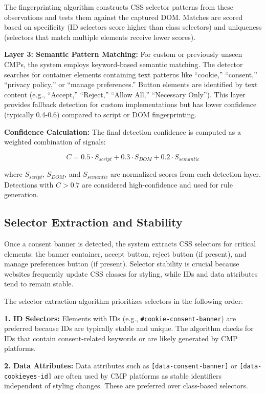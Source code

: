 \documentclass[conference]{IEEEtran}
\begin{document}
The fingerprinting algorithm constructs CSS selector patterns from these observations and tests them against the captured DOM. Matches are scored based on specificity (ID selectors score higher than class selectors) and uniqueness (selectors that match multiple elements receive lower scores).

\textbf{Layer 3: Semantic Pattern Matching:} For custom or previously unseen CMPs, the system employs keyword-based semantic matching. The detector searches for container elements containing text patterns like ``cookie,'' ``consent,'' ``privacy policy,'' or ``manage preferences.'' Button elements are identified by text content (e.g., ``Accept,'' ``Reject,'' ``Allow All,'' ``Necessary Only''). This layer provides fallback detection for custom implementations but has lower confidence (typically 0.4-0.6) compared to script or DOM fingerprinting.

\textbf{Confidence Calculation:} The final detection confidence is computed as a weighted combination of signals:

\[

C = 0.5 \cdot S_{script} + 0.3 \cdot S_{DOM} + 0.2 \cdot S_{semantic}

\]

where \(S_{script}\), \(S_{DOM}\), and \(S_{semantic}\) are normalized scores from each detection layer. Detections with \(C > 0.7\) are considered high-confidence and used for rule generation.

\subsection{Selector Extraction and Stability}

Once a consent banner is detected, the system extracts CSS selectors for critical elements: the banner container, accept button, reject button (if present), and manage preferences button (if present). Selector stability is crucial because websites frequently update CSS classes for styling, while IDs and data attributes tend to remain stable.

The selector extraction algorithm prioritizes selectors in the following order:

\textbf{1. ID Selectors:} Elements with IDs (e.g., \texttt{\#cookie-consent-banner}) are preferred because IDs are typically stable and unique. The algorithm checks for IDs that contain consent-related keywords or are likely generated by CMP platforms.

\textbf{2. Data Attributes:} Data attributes such as \texttt{[data-consent-banner]} or \texttt{[data-cookieyes-id]} are often used by CMP platforms as stable identifiers independent of styling changes. These are preferred over class-based selectors.
\end{document}
